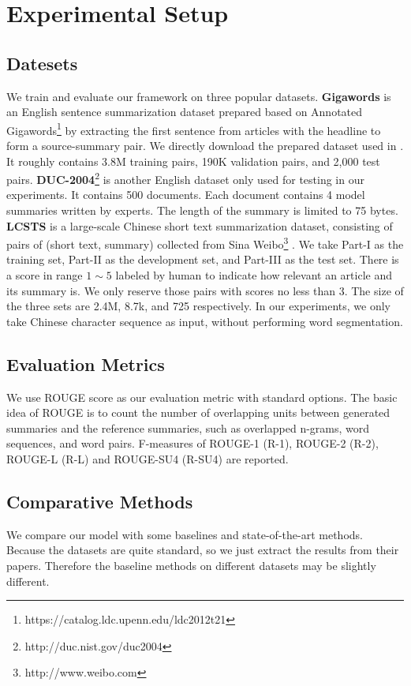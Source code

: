 \documentclass[11pt,letterpaper]{article}
\begin{document}
\section{Experimental Setup}

\subsection{Datesets}
We train and evaluate our framework on three popular datasets.
\textbf{Gigawords} is an English sentence summarization dataset prepared based on Annotated Gigawords\footnote{https://catalog.ldc.upenn.edu/ldc2012t21} by extracting the first sentence from articles with the headline to form a source-summary pair.
We directly download the prepared dataset  used in \cite{rush2015neural}.
It roughly contains 3.8M training pairs, 190K validation pairs, and 2,000 test pairs.
\textbf{DUC-2004}\footnote{http://duc.nist.gov/duc2004} is another English dataset only used for testing in our experiments. It contains 500 documents. Each document contains 4 model summaries written by experts. The length of the summary is limited to 75 bytes.
\textbf{LCSTS} is a large-scale Chinese short text summarization dataset, consisting of pairs of (short text, summary) collected from Sina Weibo\footnote{http://www.weibo.com} \cite{hu2015lcsts}.
We take Part-I as the training set, Part-II as the development set, and Part-III as the test set. There is a score in range $1\sim5$ labeled by human to indicate how relevant an article and its summary is. We only reserve those pairs with scores no less than 3. The size of the three sets are 2.4M, 8.7k, and 725 respectively.
In our experiments, we only take Chinese character sequence as input, without performing word segmentation.


\subsection{Evaluation Metrics}
We use ROUGE score \cite{lin2004rouge} as our evaluation metric with standard options.
The basic idea of ROUGE is to count the number of overlapping units between generated summaries and the reference summaries, such as overlapped n-grams, word sequences, and word pairs.
F-measures of ROUGE-1 (R-1), ROUGE-2 (R-2), ROUGE-L (R-L) and ROUGE-SU4 (R-SU4) are reported.



\subsection{Comparative Methods}
We compare our model with some baselines and state-of-the-art methods.
Because the datasets are quite standard, so we just extract the results from their papers. Therefore the baseline methods on different datasets may be slightly different.
\end{document}
